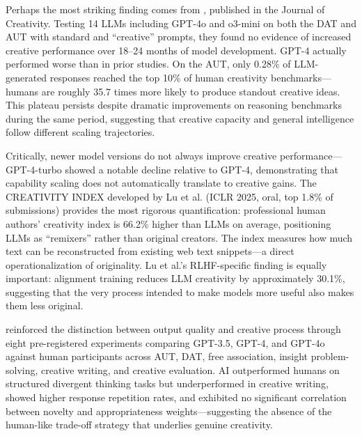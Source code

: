 \documentclass[12pt,a4paper]{article}
\begin{document}
Perhaps the most striking finding comes from \citet{haase2025}, published in the Journal of Creativity. Testing 14 LLMs including GPT-4o and o3-mini on both the DAT and AUT with standard and ``creative'' prompts, they found no evidence of increased creative performance over 18--24 months of model development. GPT-4 actually performed worse than in prior studies. On the AUT, only 0.28\% of LLM-generated responses reached the top 10\% of human creativity benchmarks---humans are roughly 35.7 times more likely to produce standout creative ideas. This plateau persists despite dramatic improvements on reasoning benchmarks during the same period, suggesting that creative capacity and general intelligence follow different scaling trajectories.

Critically, newer model versions do not always improve creative performance---GPT-4-turbo showed a notable decline relative to GPT-4, demonstrating that capability scaling does not automatically translate to creative gains. The CREATIVITY INDEX developed by Lu et al. (ICLR 2025, oral, top 1.8\% of submissions) provides the most rigorous quantification: professional human authors' creativity index is 66.2\% higher than LLMs on average, positioning LLMs as ``remixers'' rather than original creators. The index measures how much text can be reconstructed from existing web text snippets---a direct operationalization of originality. Lu et al.'s RLHF-specific finding is equally important: alignment training reduces LLM creativity by approximately 30.1\%, suggesting that the very process intended to make models more useful also makes them less original.

\citet{zhang2025creative} reinforced the distinction between output quality and creative process through eight pre-registered experiments comparing GPT-3.5, GPT-4, and GPT-4o against human participants across AUT, DAT, free association, insight problem-solving, creative writing, and creative evaluation. AI outperformed humans on structured divergent thinking tasks but underperformed in creative writing, showed higher response repetition rates, and exhibited no significant correlation between novelty and appropriateness weights---suggesting the absence of the human-like trade-off strategy that underlies genuine creativity.
\end{document}
